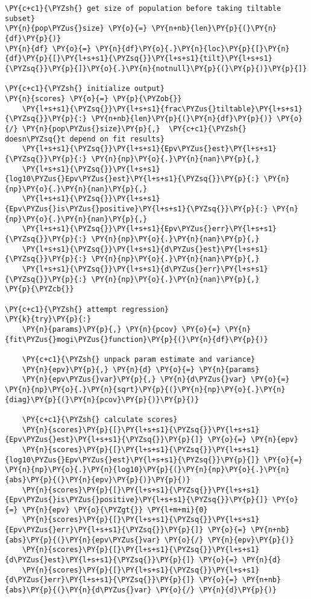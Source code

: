\begin{tcolorbox}[breakable, size=fbox, boxrule=1pt, pad at break*=1mm,colback=cellbackground, colframe=cellborder]
\begin{Verbatim}[commandchars=\\\{\}]
\PY{c+c1}{\PYZsh{} get size of population before taking tiltable subset}
\PY{n}{pop\PYZus{}size} \PY{o}{=} \PY{n+nb}{len}\PY{p}{(}\PY{n}{df}\PY{p}{)}
\PY{n}{df} \PY{o}{=} \PY{n}{df}\PY{o}{.}\PY{n}{loc}\PY{p}{[}\PY{n}{df}\PY{p}{[}\PY{l+s+s1}{\PYZsq{}}\PY{l+s+s1}{tilt}\PY{l+s+s1}{\PYZsq{}}\PY{p}{]}\PY{o}{.}\PY{n}{notnull}\PY{p}{(}\PY{p}{)}\PY{p}{]}

\PY{c+c1}{\PYZsh{} initialize output}
\PY{n}{scores} \PY{o}{=} \PY{p}{\PYZob{}}
    \PY{l+s+s1}{\PYZsq{}}\PY{l+s+s1}{frac\PYZus{}tiltable}\PY{l+s+s1}{\PYZsq{}}\PY{p}{:} \PY{n+nb}{len}\PY{p}{(}\PY{n}{df}\PY{p}{)} \PY{o}{/} \PY{n}{pop\PYZus{}size}\PY{p}{,}  \PY{c+c1}{\PYZsh{} doesn\PYZsq{}t depend on fit results}
    \PY{l+s+s1}{\PYZsq{}}\PY{l+s+s1}{Epv\PYZus{}est}\PY{l+s+s1}{\PYZsq{}}\PY{p}{:} \PY{n}{np}\PY{o}{.}\PY{n}{nan}\PY{p}{,}
    \PY{l+s+s1}{\PYZsq{}}\PY{l+s+s1}{log10\PYZus{}Epv\PYZus{}est}\PY{l+s+s1}{\PYZsq{}}\PY{p}{:} \PY{n}{np}\PY{o}{.}\PY{n}{nan}\PY{p}{,}
    \PY{l+s+s1}{\PYZsq{}}\PY{l+s+s1}{Epv\PYZus{}is\PYZus{}positive}\PY{l+s+s1}{\PYZsq{}}\PY{p}{:} \PY{n}{np}\PY{o}{.}\PY{n}{nan}\PY{p}{,}
    \PY{l+s+s1}{\PYZsq{}}\PY{l+s+s1}{Epv\PYZus{}err}\PY{l+s+s1}{\PYZsq{}}\PY{p}{:} \PY{n}{np}\PY{o}{.}\PY{n}{nan}\PY{p}{,}
    \PY{l+s+s1}{\PYZsq{}}\PY{l+s+s1}{d\PYZus{}est}\PY{l+s+s1}{\PYZsq{}}\PY{p}{:} \PY{n}{np}\PY{o}{.}\PY{n}{nan}\PY{p}{,}
    \PY{l+s+s1}{\PYZsq{}}\PY{l+s+s1}{d\PYZus{}err}\PY{l+s+s1}{\PYZsq{}}\PY{p}{:} \PY{n}{np}\PY{o}{.}\PY{n}{nan}\PY{p}{,}
\PY{p}{\PYZcb{}}

\PY{c+c1}{\PYZsh{} attempt regression}
\PY{k}{try}\PY{p}{:}
    \PY{n}{params}\PY{p}{,} \PY{n}{pcov} \PY{o}{=} \PY{n}{fit\PYZus{}mogi\PYZus{}function}\PY{p}{(}\PY{n}{df}\PY{p}{)}

    \PY{c+c1}{\PYZsh{} unpack param estimate and variance}
    \PY{n}{epv}\PY{p}{,} \PY{n}{d} \PY{o}{=} \PY{n}{params}
    \PY{n}{epv\PYZus{}var}\PY{p}{,} \PY{n}{d\PYZus{}var} \PY{o}{=} \PY{n}{np}\PY{o}{.}\PY{n}{sqrt}\PY{p}{(}\PY{n}{np}\PY{o}{.}\PY{n}{diag}\PY{p}{(}\PY{n}{pcov}\PY{p}{)}\PY{p}{)}

    \PY{c+c1}{\PYZsh{} calculate scores}
    \PY{n}{scores}\PY{p}{[}\PY{l+s+s1}{\PYZsq{}}\PY{l+s+s1}{Epv\PYZus{}est}\PY{l+s+s1}{\PYZsq{}}\PY{p}{]} \PY{o}{=} \PY{n}{epv}
    \PY{n}{scores}\PY{p}{[}\PY{l+s+s1}{\PYZsq{}}\PY{l+s+s1}{log10\PYZus{}Epv\PYZus{}est}\PY{l+s+s1}{\PYZsq{}}\PY{p}{]} \PY{o}{=} \PY{n}{np}\PY{o}{.}\PY{n}{log10}\PY{p}{(}\PY{n}{np}\PY{o}{.}\PY{n}{abs}\PY{p}{(}\PY{n}{epv}\PY{p}{)}\PY{p}{)}
    \PY{n}{scores}\PY{p}{[}\PY{l+s+s1}{\PYZsq{}}\PY{l+s+s1}{Epv\PYZus{}is\PYZus{}positive}\PY{l+s+s1}{\PYZsq{}}\PY{p}{]} \PY{o}{=} \PY{n}{epv} \PY{o}{\PYZgt{}} \PY{l+m+mi}{0}
    \PY{n}{scores}\PY{p}{[}\PY{l+s+s1}{\PYZsq{}}\PY{l+s+s1}{Epv\PYZus{}err}\PY{l+s+s1}{\PYZsq{}}\PY{p}{]} \PY{o}{=} \PY{n+nb}{abs}\PY{p}{(}\PY{n}{epv\PYZus{}var} \PY{o}{/} \PY{n}{epv}\PY{p}{)}
    \PY{n}{scores}\PY{p}{[}\PY{l+s+s1}{\PYZsq{}}\PY{l+s+s1}{d\PYZus{}est}\PY{l+s+s1}{\PYZsq{}}\PY{p}{]} \PY{o}{=} \PY{n}{d}
    \PY{n}{scores}\PY{p}{[}\PY{l+s+s1}{\PYZsq{}}\PY{l+s+s1}{d\PYZus{}err}\PY{l+s+s1}{\PYZsq{}}\PY{p}{]} \PY{o}{=} \PY{n+nb}{abs}\PY{p}{(}\PY{n}{d\PYZus{}var} \PY{o}{/} \PY{n}{d}\PY{p}{)}


\end{Verbatim}
\end{tcolorbox}
